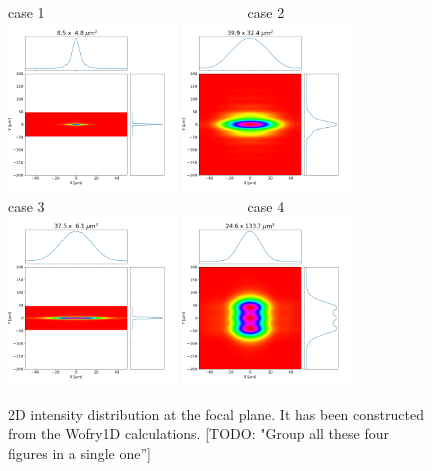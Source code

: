 \documentclass{iucr}              %
\newcommand{\todo}[1]{{\color{red}[TODO: "#1'']}}
\begin{document}
\begin{figure}\label{fig:2DWofry1D}
    \centering
    case 1~~~~~~~~~~~~~~~~~~~~~~~~~~~~~case 2\\
    \includegraphics[width=0.4\textwidth]{figures/case1_wofry_ws_results.png}
    \includegraphics[width=0.4\textwidth]{figures/case2_wofry_ws_results.png}\\
    case 3~~~~~~~~~~~~~~~~~~~~~~~~~~~~~case 4\\
    \includegraphics[width=0.4\textwidth]{figures/case3_wofry_ws_results.png}
    \includegraphics[width=0.4\textwidth]{figures/case4_wofry_ws_results.png}
    \caption{2D intensity distribution at the focal plane. It has been constructed from the Wofry1D calculations.
    \todo{Group all these four figures in a single one}
    }
\end{figure}
\end{document}
